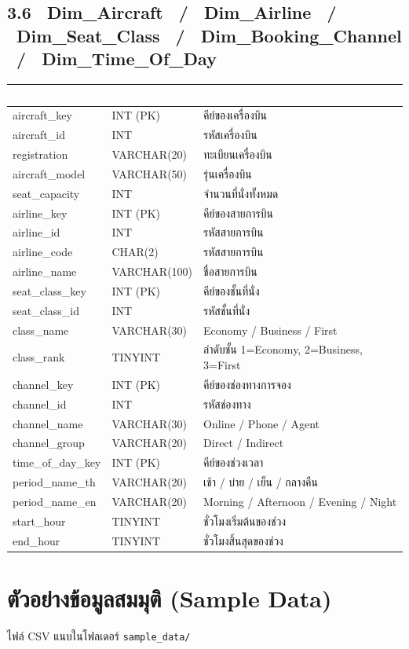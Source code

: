 \documentclass[11pt]{article}
\makeatletter
\newcommand{\code}[1]{\texttt{#1}}
\newcommand{\atthead}{\rowcolor{tblHead}
  \textcolor{white}{\textbf{Attribute}} & \textcolor{white}{\textbf{Data Type}} & \textcolor{white}{\textbf{คำอธิบาย}}\\}
\newenvironment{atttable}[1]%
  {\subsection*{#1}\vspace{-4pt}
   \begin{tabular}{@{}>{\ttfamily\small}p{4.3cm} >{\small}p{2.7cm} >{\small\raggedright\arraybackslash}p{9.4cm}@{}}
   \toprule\atthead \midrule}%
  {\bottomrule\end{tabular}\vspace{3pt}}
\makeatother
\begin{document}
\begin{atttable}{3.6 \ Dim_Aircraft \ / \ Dim_Airline \ / \ Dim_Seat_Class \ / \ Dim_Booking_Channel \ / \ Dim_Time_Of_Day}
aircraft_key    & INT (PK)     & คีย์ของเครื่องบิน\\
aircraft_id     & INT          & รหัสเครื่องบิน\\
registration    & VARCHAR(20)  & ทะเบียนเครื่องบิน\\
aircraft_model  & VARCHAR(50)  & รุ่นเครื่องบิน\\
seat_capacity   & INT          & จำนวนที่นั่งทั้งหมด\\
\midrule
airline_key     & INT (PK)     & คีย์ของสายการบิน\\
airline_id      & INT          & รหัสสายการบิน\\
airline_code    & CHAR(2)      & รหัสสายการบิน\\
airline_name    & VARCHAR(100) & ชื่อสายการบิน\\
\midrule
seat_class_key  & INT (PK)     & คีย์ของชั้นที่นั่ง\\
seat_class_id   & INT          & รหัสชั้นที่นั่ง\\
class_name      & VARCHAR(30)  & Economy / Business / First\\
class_rank      & TINYINT      & ลำดับชั้น 1=Economy, 2=Business, 3=First\\
\midrule
channel_key     & INT (PK)     & คีย์ของช่องทางการจอง\\
channel_id      & INT          & รหัสช่องทาง\\
channel_name    & VARCHAR(30)  & Online / Phone / Agent\\
channel_group   & VARCHAR(20)  & Direct / Indirect\\
\midrule
time_of_day_key & INT (PK)     & คีย์ของช่วงเวลา\\
period_name_th  & VARCHAR(20)  & เช้า / บ่าย / เย็น / กลางคืน\\
period_name_en  & VARCHAR(20)  & Morning / Afternoon / Evening / Night\\
start_hour      & TINYINT      & ชั่วโมงเริ่มต้นของช่วง\\
end_hour        & TINYINT      & ชั่วโมงสิ้นสุดของช่วง\\
\end{atttable}

\clearpage
\section{ตัวอย่างข้อมูลสมมุติ (Sample Data)}
\noindent\small ไฟล์ CSV แนบในโฟลเดอร์ \code{sample_data/}\normalsize
\vspace{4pt}
\end{document}
